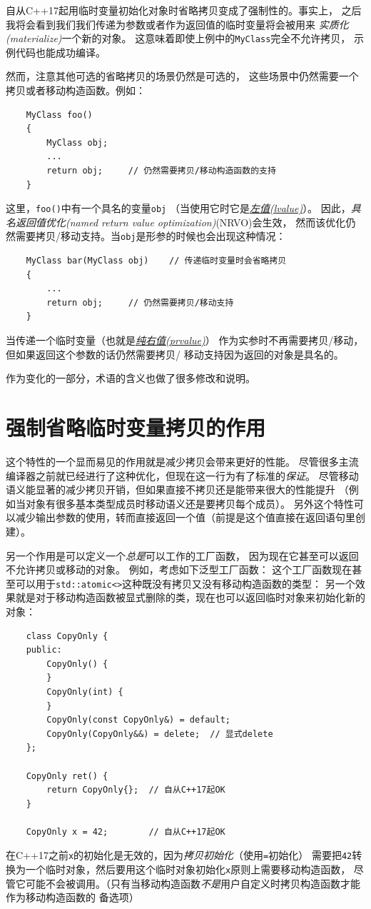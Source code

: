 自从C++17起用临时变量初始化对象时省略拷贝变成了强制性的。事实上，
之后我将会看到我们我们传递为参数或者作为返回值的临时变量将会被用来
\emph{实质化(materialize)}一个新的对象。
这意味着即使上例中的\texttt{MyClass}完全不允许拷贝，
示例代码也能成功编译。

然而，注意其他可选的省略拷贝的场景仍然是可选的，
这些场景中仍然需要一个拷贝或者移动构造函数。例如：
\begin{lstlisting}
    MyClass foo()
    {
        MyClass obj;
        ...
        return obj;     // 仍然需要拷贝/移动构造函数的支持
    }
\end{lstlisting}
这里，\texttt{foo()}中有一个具名的变量\texttt{obj}
（当使用它时它是\hyperref[ch5.3.1.1]{\emph{左值(lvalue)}}）。
因此，\emph{具名返回值优化(named return value optimization)}(NRVO)会生效，
然而该优化仍然需要拷贝/移动支持。当\texttt{obj}是形参的时候也会出现这种情况：
\begin{lstlisting}
    MyClass bar(MyClass obj)    // 传递临时变量时会省略拷贝
    {
        ...
        return obj;     // 仍然需要拷贝/移动支持
    }
\end{lstlisting}
当传递一个临时变量（也就是\hyperref[ch5.3.1.1]{\emph{纯右值(prvalue)}}）
作为实参时不再需要拷贝/移动，但如果返回这个参数的话仍然需要拷贝/
移动支持因为返回的对象是具名的。

作为变化的一部分，术语的含义也做了很多修改和说明。


\section{强制省略临时变量拷贝的作用}
这个特性的一个显而易见的作用就是减少拷贝会带来更好的性能。
尽管很多主流编译器之前就已经进行了这种优化，但现在这一行为有了标准的\emph{保证}。
尽管移动语义能显著的减少拷贝开销，但如果直接不拷贝还是能带来很大的性能提升
（例如当对象有很多基本类型成员时移动语义还是要拷贝每个成员）。
另外这个特性可以减少输出参数的使用，转而直接返回一个值（前提是这个值直接在返回语句里创建）。

另一个作用是可以定义一个\emph{总是}可以工作的工厂函数，
因为现在它甚至可以返回不允许拷贝或移动的对象。
例如，考虑如下泛型工厂函数：
这个工厂函数现在甚至可以用于\texttt{std::atomic<>}这种既没有拷贝又没有移动构造函数的类型：
另一个效果就是对于移动构造函数被显式删除的类，现在也可以返回临时对象来初始化新的对象：
\begin{lstlisting}
    class CopyOnly {
    public:
        CopyOnly() {
        }
        CopyOnly(int) {
        }
        CopyOnly(const CopyOnly&) = default;
        CopyOnly(CopyOnly&&) = delete;  // 显式delete
    };

    CopyOnly ret() {
        return CopyOnly{};  // 自从C++17起OK
    }

    CopyOnly x = 42;        // 自从C++17起OK
\end{lstlisting}
在C++17之前\texttt{x}的初始化是无效的，因为\emph{拷贝初始化}（使用\texttt{=}初始化）
需要把\texttt{42}转换为一个临时对象，然后要用这个临时对象初始化\texttt{x}原则上需要移动构造函数，
尽管它可能不会被调用。（只有当移动构造函数\emph{不是}用户自定义时拷贝构造函数才能作为移动构造函数的
备选项）


